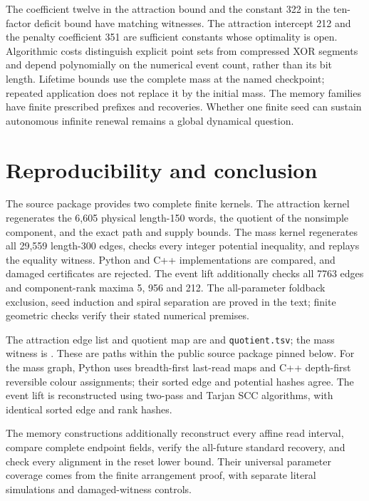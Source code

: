 \documentclass[
  11pt,
]{article}
\begin{document}
The coefficient twelve in the attraction bound and the constant 322 in the
ten-factor deficit bound have matching witnesses. The attraction intercept
212 and the penalty coefficient 351 are sufficient constants whose optimality
is open. Algorithmic costs distinguish explicit point sets from compressed
XOR segments and depend polynomially on the numerical event count, rather
than its bit length. Lifetime bounds use the complete mass at the named
checkpoint; repeated application does not replace it by the initial mass.
The memory families have finite prescribed prefixes and recoveries. Whether
one finite seed can sustain autonomous infinite renewal remains a global
dynamical question.

\section{Reproducibility and
conclusion}\label{reproducibility-and-conclusion}

The source package provides two complete finite kernels. The attraction
kernel regenerates the 6,605 physical length-150 words, the quotient of
the nonsimple component, and the exact path and supply bounds. The mass
kernel regenerates all 29,559 length-300 edges, checks every integer
potential inequality, and replays the equality witness. Python and C++
implementations are compared, and damaged certificates are rejected. The
event lift additionally checks all 7763 edges and component-rank maxima
5, 956 and 212. The all-parameter foldback exclusion, seed induction and spiral separation
are proved in the text; finite geometric checks verify their stated
numerical premises.

The attraction edge list and quotient map are
 and
\texttt{quotient.tsv}; the mass witness is
. These are paths within the public
source package pinned below. For the mass graph, Python uses breadth-first
last-read maps and C++ depth-first reversible colour assignments; their sorted
edge and potential hashes agree. The event lift is reconstructed using two-pass
and Tarjan SCC algorithms, with identical sorted edge and rank hashes.

The memory constructions additionally reconstruct every affine read interval,
compare complete endpoint fields, verify the all-future standard recovery,
and check every alignment in the reset lower bound. Their universal parameter
coverage comes from the finite arrangement proof, with separate literal
simulations and damaged-witness controls.
\end{document}

